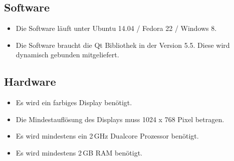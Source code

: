 \subsection{Software}
\begin{itemize}
\item Die Software läuft unter Ubuntu 14.04 / Fedora 22 / Windows 8. 
\item Die Software braucht die \gls{Qt} Bibliothek in der Version 5.5. Diese wird dynamisch gebunden mitgeliefert.
\end{itemize}
\subsection{Hardware}
\begin{itemize}
\item Es wird ein farbiges Display benötigt. 
\item Die Mindestauflösung des Displays muss 1024 x 768 Pixel betragen.
\item Es wird mindestens ein 2\,GHz Dualcore Prozessor benötigt.
\item Es wird mindestens 2\,GB RAM benötigt.
\end{itemize}
\pagebreak
